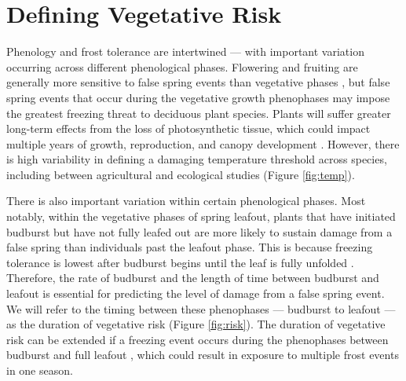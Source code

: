 \documentclass{article}\usepackage[]{graphicx}\usepackage[]{color}
\begin{document}
\section* {Defining Vegetative Risk} %
Phenology and frost tolerance are intertwined --- with important variation occurring across different phenological phases. Flowering and fruiting are generally more sensitive to false spring events than vegetative phases \citep{Augspurger2009, Lenz2013}, but false spring events that occur during the vegetative growth phenophases may impose the greatest freezing threat to deciduous plant species.  Plants will suffer greater long-term effects from the loss of photosynthetic tissue, which could impact multiple years of growth, reproduction, and canopy development \citep{Vitasse2014, Xie2015}. However, there is high variability in defining a damaging temperature threshold across species, including between agricultural and ecological studies (Figure \ref{fig:temp}).

There is also important variation within certain phenological phases. Most notably, within the vegetative phases of spring leafout, plants that have initiated budburst but have not fully leafed out are more likely to sustain damage from a false spring than individuals past the leafout phase. This is because freezing tolerance is lowest after budburst begins until the leaf is fully unfolded \citep{Lenz2016}. Therefore, the rate of budburst and the length of time between budburst and leafout is essential for predicting the level of damage from a false spring event. We will refer to the timing between these phenophases --- budburst to leafout --- as the duration of vegetative risk (Figure \ref{fig:risk}). The duration of vegetative risk can be extended if a freezing event occurs during the phenophases between budburst and full leafout \citep{Augspurger2009}, which could result in exposure to multiple frost events in one season.
\end{document}

